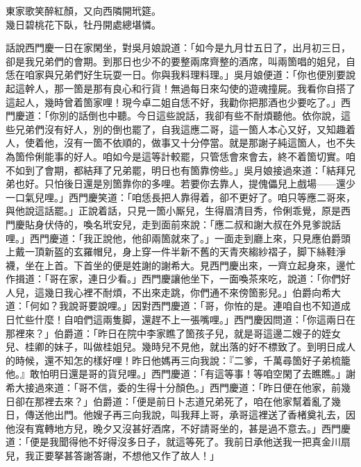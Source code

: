 \begin{myquote}
東家歌笑醉紅顏，又向西隣開玳筵。\\
幾日碧桃花下臥，牡丹開處總堪憐。
\end{myquote}

話說西門慶一日在家閑坐，對吳月娘說道：「如今是九月廿五日了，出月初三日，卻是我兄弟們的會期。到那日也少不的要整兩席齊整的酒席，叫兩箇唱的姐兒，自恁在咱家與兄弟們好生玩耍一日。你與我料理料理。」吳月娘便道：「你也便別要說起這幹人，那一箇是那有良心和行貨！無過每日來勾使的遊魂撞屍。我看你自搭了這起人，幾時曾着箇家哩！{}現今卓二姐自恁不好，我勸你把那酒也少要吃了。」西門慶道：「你別的話倒也中聽。今日這些說話，我卻有些不耐煩聽他。依你說，這些兄弟們沒有好人，別的倒也罷了，自我這應二哥，這一箇人本心又好，又知趣着人，{}使着他，沒有一箇不依順的，做事又十分停當。就是那謝子純這箇人，也不失為箇伶俐能事的好人。咱如今是這等計較罷，只管恁會來會去，終不着箇切實。咱不如到了會期，都結拜了兄弟罷，明日也有箇靠傍些。」吳月娘接過來道：「結拜兄弟也好。只怕後日還是別箇靠你的多哩。若要你去靠人，提傀儡兒上戲場——還少一口氣兒哩。」西門慶笑道：「咱恁長把人靠得着，卻不更好了。咱只等應二哥來，與他說這話罷。」正說着話，只見一箇小厮兒，生得眉清目秀，伶俐乖覺，原是西門慶貼身伏侍的，喚名玳安兒，走到面前來說：「應二叔和謝大叔在外見爹說話哩。」西門慶道：「我正說他，他卻兩箇就來了。」一面走到廳上來，只見應伯爵頭上戴一頂新盔的玄羅帽兒，身上穿一件半新不舊的天青夾縐紗褶子，脚下絲鞋淨襪，坐在上首。下首坐的便是姓謝的謝希大。見西門慶出來，一齊立起身來，邊忙作揖道：「哥在家，連日少看。」西門慶讓他坐下，一面喚茶來吃，說道：「你們好人兒，這幾日我心裡不耐煩，不出來走跳，你們通不來傍箇影兒。」伯爵向希大道：「何如？我說哥要說哩。」因對西門慶道：「哥，你恠的是。連咱自也不知道成日忙些什麼！自咱們這兩隻脚，還趕不上一張嘴哩。」西門慶因問道：「你這兩日在那裡來？」伯爵道：「昨日在院中李家瞧了箇孩子兒，就是哥這邊二嫂子的姪女兒、桂卿的妹子，叫做桂姐兒。幾時兒不見他，就出落的好不標致了。到明日成人的時候，還不知怎的樣好哩！昨日他媽再三向我說：『二爹，千萬尋箇好子弟梳籠他。』敢怕明日還是哥的貨兒哩。」{}西門慶道：「有這等事！等咱空閑了去瞧瞧。」謝希大接過來道：「哥不信，委的生得十分顏色。」西門慶道：「昨日便在他家，前幾日卻在那裡去來？」伯爵道：「便是前日卜志道兄弟死了，咱在他家幫着亂了幾日，傳送他出門。{}他嫂子再三向我說，叫我拜上哥，承哥這裡送了香楮奠礼去，因他沒有寬轉地方兒，晚夕又沒甚好酒席，不好請哥坐的，甚是過不意去。」西門慶道：「便是我聞得他不好得沒多日子，就這等死了。我前日承他送我一把真金川扇兒，我正要拏甚答謝答謝，不想他又作了故人！」

